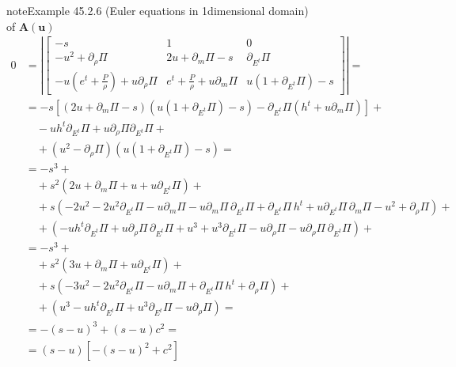 \documentclass[letterpaper,10pt,english]{jupyterBook}
\begin{document}
\begin{sphinxadmonition}{note}{Example 45.2.6 (Euler equations in 1\sphinxhyphen{}dimensional domain)}
\begin{equation*}
\end{equation*}
\sphinxAtStartPar
{} of \(\mathbf{A}(\mathbf{u})\)
\begin{equation*}
\begin{split}
  0
  & = \left| \begin{bmatrix} -s & 1 & 0 \\ 
   -u^2 + \partial_\rho \Pi & 2 u + \partial_m \Pi - s & \partial_{E^t} \Pi \\
   - u \left(e^t+\frac{P}{\rho} \right)+ u \partial_\rho \Pi & e^t + \frac{P}{\rho} + u \partial_{m} \Pi & u \left( 1 + \partial_{E^t} \Pi \right) - s
  \end{bmatrix} \right| = \\
  & = - s \left[ \left( 2 u + \partial_m \Pi - s  \right) \left( u \left( 1 + \partial_{E^t} \Pi \right) - s \right) - \partial_{E^t} \Pi \left( h^t + u \partial_m \Pi \right) \right] + \\
  & \quad - u h^t \partial_{E^t} \Pi + u \partial_\rho \Pi \partial_{E^t} \Pi + \\
  & \quad + (u^2 - \partial_\rho \Pi) \left( u (1 + \partial_{E^t} \Pi) - s \right) = \\
  & = -s^3 + \\
  & \quad + s^2 \left( 2 u + \partial_m \Pi + u + u \partial_{E^t} \Pi  \right) + \\
  & \quad + s   \left( - 2 u^2 - 2u^2 \partial_{E^t} \Pi - u \partial_m \Pi - u \partial_m \Pi \, \partial_{E^t} \Pi + \partial_{E^t} \Pi \, h^t + u \partial_{E^t} \Pi \, \partial_m \Pi - u^2 + \partial_{\rho} \Pi  \right) + \\
  & \quad +     \left( -u h^t \partial_{E^t} \Pi + u \partial_{\rho} \Pi \, \partial_{E^t} \Pi + u^3 + u^3 \partial_{E^t} \Pi - u \partial_{\rho} \Pi - u \partial_{\rho} \Pi \, \partial_{E^t} \Pi \right) + \\
  & = -s^3 + \\
  & \quad + s^2 \left( 3 u + \partial_m \Pi + u \partial_{E^t} \Pi  \right) + \\
  & \quad + s   \left( - 3 u^2 - 2u^2 \partial_{E^t} \Pi - u \partial_m \Pi + \partial_{E^t} \Pi \, h^t + \partial_{\rho} \Pi  \right) + \\
  & \quad +     \left( u^3 - u h^t \partial_{E^t} \Pi + u^3 \partial_{E^t} \Pi - u \partial_{\rho} \Pi \right) = \\
  & = - (s - u)^3 + ( s - u ) c^2 = \\
  & = ( s - u ) \left[ -(s-u)^2 + c^2 \right]
\end{split}

\end{equation*}
\end{sphinxadmonition}
\end{document}
